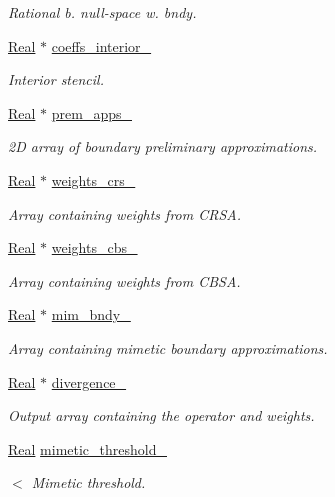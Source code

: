 \begin{DoxyCompactItemize}
\begin{DoxyCompactList}\small\item\em Rational b. null-\/space w. bndy. \end{DoxyCompactList}\item 
\hyperlink{group__c01-roots_gac080bbbf5cbb5502c9f00405f894857d}{Real} $\ast$ \hyperlink{classmtk_1_1Div1D_a7c7688d8ac25120587353ece4e93a13a}{coeffs\-\_\-interior\-\_\-}
\begin{DoxyCompactList}\small\item\em Interior stencil. \end{DoxyCompactList}\item 
\hyperlink{group__c01-roots_gac080bbbf5cbb5502c9f00405f894857d}{Real} $\ast$ \hyperlink{classmtk_1_1Div1D_ab51ff3db86a874604d6c756ab6770950}{prem\-\_\-apps\-\_\-}
\begin{DoxyCompactList}\small\item\em 2\-D array of boundary preliminary approximations. \end{DoxyCompactList}\item 
\hyperlink{group__c01-roots_gac080bbbf5cbb5502c9f00405f894857d}{Real} $\ast$ \hyperlink{classmtk_1_1Div1D_ad36dcfade921f0488fe3edaecc17bd75}{weights\-\_\-crs\-\_\-}
\begin{DoxyCompactList}\small\item\em Array containing weights from C\-R\-S\-A. \end{DoxyCompactList}\item 
\hyperlink{group__c01-roots_gac080bbbf5cbb5502c9f00405f894857d}{Real} $\ast$ \hyperlink{classmtk_1_1Div1D_a631dad42a0ec0f5d5ac767abdfd8949c}{weights\-\_\-cbs\-\_\-}
\begin{DoxyCompactList}\small\item\em Array containing weights from C\-B\-S\-A. \end{DoxyCompactList}\item 
\hyperlink{group__c01-roots_gac080bbbf5cbb5502c9f00405f894857d}{Real} $\ast$ \hyperlink{classmtk_1_1Div1D_a6d6c600117fdb583f061da0c9d5f28f7}{mim\-\_\-bndy\-\_\-}
\begin{DoxyCompactList}\small\item\em Array containing mimetic boundary approximations. \end{DoxyCompactList}\item 
\hyperlink{group__c01-roots_gac080bbbf5cbb5502c9f00405f894857d}{Real} $\ast$ \hyperlink{classmtk_1_1Div1D_a0f96410051ba1fa6d91dfa7b7eacead9}{divergence\-\_\-}
\begin{DoxyCompactList}\small\item\em Output array containing the operator and weights. \end{DoxyCompactList}\item 
\hyperlink{group__c01-roots_gac080bbbf5cbb5502c9f00405f894857d}{Real} \hyperlink{classmtk_1_1Div1D_a40ed629199b38133f5652b71e8b1cd06}{mimetic\-\_\-threshold\-\_\-}
\begin{DoxyCompactList}\small\item\em $<$ Mimetic threshold. \end{DoxyCompactList}\end{DoxyCompactItemize}
